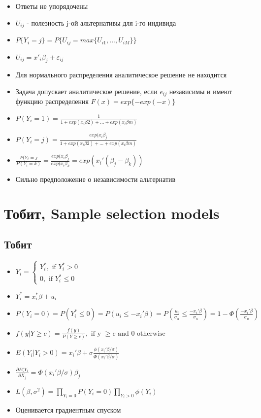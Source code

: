 \documentclass[a4paper, 12pt]{article}
\begin{document}
\begin{itemize}
    \item Ответы не упорядочены
    \item $U_{ij}$ - полезность j-ой альтернативы для i-го индивида
    \item $P\{Y_{i} = j\} = P\{U_{ij} = max\{U_{i1}, ..., U_{iM}\}\}$
    \item $U_{ij} = x'_{i}\beta_{j} + \varepsilon_{ij}$
    \item Для нормального распределения аналитическое решение не находится
    \item Задача допускает аналитическое решение, если $e_{ij}$ независимы и имеют функцию распределения $F(x) = exp\{-exp(-x)\}$
    \item $P(Y_{i} = 1) = \frac{1}{1 + exp(x_{i}\beta{2}) + ... + exp(x_{i}\beta{m})}$
    \item $P(Y_{i} = j) = \frac{exp(x_{i}\beta_{j}}{1 + exp(x_{i}\beta{2}) + ... + exp(x_{i}\beta{m})}$
    \item $\frac{P(Y_{i} = j}{P(Y_{i} = k)} = \frac{exp(x_{i}\beta_{j}}{exp(x_{i}\beta_{k}} = exp(x_{i}'(\beta_{j} - \beta_{k}))$
    \item Сильно предположение о независимости альтернатив
\end{itemize}

\section{Тобит, Sample selection models}

\subsection{Тобит}

\begin{itemize}
    \item $Y_{i} = \begin{cases}Y_{i}^{*}, \textrm{ if } Y_{i}^{*} > 0 \\ 0, \textrm{ if } Y_{i}^{*} \leq 0\end{cases}$
    \item $Y_{i}^{*} = x_{i}^{*}\beta + u_{i}$
    \item $P(Y_{i} = 0) = P(Y_{i}^{*} \leq 0) = P(u_{i} \leq -x_{i}'\beta) = P(\frac{u_{i}}{\sigma_{u}} \leq \frac{-x_{i}'\beta}{\sigma_{u}}) = 1 - \Phi(\frac{-x_{i}'\beta}{\sigma_{u}})$
    \item $f(y|Y \geq c) = \frac{f(y)}{P(Y \geq c)}, \textrm{ if y } \geq \textrm{c and 0 otherwise}$
    \item $E(Y_{i}|Y_{i} > 0) = x_{i}'\beta + \sigma\frac{\phi(x_{i}'\beta / \sigma)}{\Phi(x_{i}'\beta / \sigma)}$
    \item $\frac{\partial E(Y_{i}}{\partial X_{j}} = \Phi(x_{i}'\beta / \sigma)\beta_{j}$
    \item $L(\beta, \sigma^{2}) = \prod_{Y_{i} = 0}P(Y_{i} = 0)\prod_{Y_{i} > 0}\phi(Y_{i})$
    \item Оценивается градиентным спуском
\end{itemize}
\end{document}
